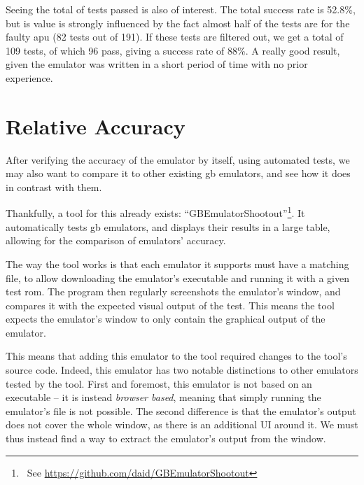 \documentclass[11pt]{informatics-report}
\newcommand{\ftnt}[1]{\footnote{~See \url{#1}}}
\begin{document}
Seeing the total of tests passed is also of interest. The total success rate is 52.8\%, but is value is strongly influenced by the fact almost half of the tests are for the faulty \gls{apu} (82 tests out of 191). If these tests are filtered out, we get a total of 109 tests, of which 96 pass, giving a success rate of 88\%. A really good result, given the emulator was written in a short period of time with no prior experience.

\section{Relative Accuracy}

After verifying the accuracy of the emulator by itself, using automated tests, we may also want to compare it to other existing \gls{gb} emulators, and see how it does in contrast with them.

Thankfully, a tool for this already exists: ``GBEmulatorShootout''\ftnt{https://github.com/daid/GBEmulatorShootout}. It automatically tests \gls{gb} emulators, and displays their results in a large table, allowing for the comparison of emulators' accuracy.

The way the tool works is that each emulator it supports must have a matching file, to allow downloading the emulator's executable and running it with a given test \gls{rom}. The program then regularly screenshots the emulator's window, and compares it with the expected visual output of the test. This means the tool expects the emulator's window to only contain the graphical output of the emulator.

This means that adding this emulator to the tool required changes to the tool's source code. Indeed, this emulator has two notable distinctions to other emulators tested by the tool. First and foremost, this emulator is not based on an executable -- it is instead \textit{browser based}, meaning that simply running the emulator's file is not possible. The second difference is that the emulator's output does not cover the whole window, as there is an additional UI around it. We must thus instead find a way to extract the emulator's output from the window.
\end{document}
